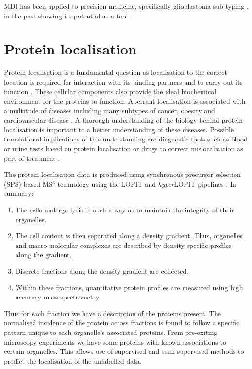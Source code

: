 \documentclass[11pt]{article} %
\begin{document}
MDI has been applied to precision medicine, specifically glioblastoma sub-typing \cite{SavageIdentifyingcancersubtypes2013a}, in the past showing its potential as a tool.

\section{Protein localisation}
Protein localisation is a fundamental question as localisation to the correct location is required for interaction with its binding partners and to carry out its function \cite{GibsonCellregulationdetermined2009}. These cellular components also provide the ideal biochemical environment for the proteins to function. Aberrant localisation is associated with a multitude of diseases including many subtypes of cancer, obesity and cardiovascular disease \cite{SiljeeSubcellularlocalizationMC4R2018a}\cite{HungProteinlocalizationdisease2011a}\cite{KauNucleartransportcancer2004a}. A thorough understanding of the biology behind protein localisation is important to a better understanding of these diseases. Possible translational implications of this understanding are diagnostic tools such as blood or urine tests based on protein localisation or drugs to correct mislocalisation as part of treatment \cite{KauNucleartransportcancer2004a}\cite{HorganOmictechnologiesgenomics2011a}.

The protein localisation data is produced using synchronous precursor selection (SPS)-based MS$^3$ technology using the LOPIT and \emph{hyper}LOPIT pipelines \cite{GeladakiLOPITDCsimplerapproach2018}\cite{DunkleyLocalizationOrganelleProteins2004}. In summary:
\begin{enumerate}
 \item The cells undergo lysis in such a way as to maintain the integrity of their organelles.
 \item The cell content is then separated along a density gradient. Thus, organelles and macro-molecular complexes are described by density-specific profiles along the gradient.
 \item Discrete fractions along the density gradient are collected.
 \item Within these fractions, quantitative protein profiles are measured using high accuracy mass spectrometry.
\end{enumerate}
Thus for each fraction we have a description of the proteins present. The normalised incidence of the protein across fractions is found to follow a specific pattern unique to each organelle's associated proteins. From pre-exiting microscopy experiments we have some proteins with known associations to certain organelles. This allows use of supervised and semi-supervised methods to predict the localisation of the unlabelled data.
\end{document}

